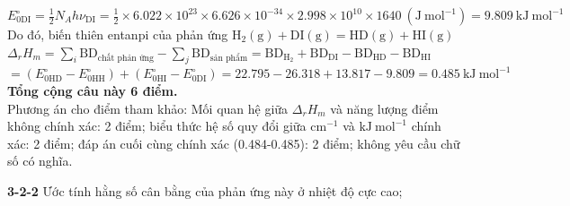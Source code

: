 {\begin{minipage}{\dimexpr\textwidth-2\fboxsep-2\fboxrule\relax}
$E_{0\mathrm{DI}}^\circ = \frac{1}{2}N_A h\nu_{\mathrm{DI}} = \frac{1}{2}\times 6.022\times 10^{23} \times 6.626\times 10^{-34} \times 2.998\times 10^{10} \times 1640\ (\mathrm{J\ mol^{-1}}) = 9.809\ \mathrm{kJ\ mol^{-1}}$ \\[0.1cm]
Do đó, biến thiên entanpi của phản ứng $\mathrm{H_2(g) + DI(g) = HD(g) + HI(g)}$ \\[0.1cm]
$\Delta_r H_m = \sum_i \mathrm{BD}_{\text{chất phản ứng}} - \sum_j \mathrm{BD}_{\text{sản phẩm}} = \mathrm{BD}_{\mathrm{H_2}} + \mathrm{BD}_{\mathrm{DI}} - \mathrm{BD}_{\mathrm{HD}} - \mathrm{BD}_{\mathrm{HI}}$ \\[0.1cm]
$= (E_{0\mathrm{HD}}^\circ - E_{0\mathrm{HH}}^\circ) + (E_{0\mathrm{HI}}^\circ - E_{0\mathrm{DI}}^\circ) = 22.795 - 26.318 + 13.817 - 9.809 = 0.485\ \mathrm{kJ\ mol^{-1}}$ \\[0.2cm]
\textbf{Tổng cộng câu này 6 điểm.} \\[0.1cm]
Phương án cho điểm tham khảo: Mối quan hệ giữa $\Delta_r H_m$ và năng lượng điểm không chính xác: 2 điểm; biểu thức hệ số quy đổi giữa $\mathrm{cm^{-1}}$ và $\mathrm{kJ\ mol^{-1}}$ chính xác: 2 điểm; đáp án cuối cùng chính xác (0.484-0.485): 2 điểm; không yêu cầu chữ số có nghĩa.
\vspace{0.1cm}
\end{minipage}
}

\vspace{0.2cm}

\noindent
\textbf{3-2-2} Ước tính hằng số cân bằng của phản ứng này ở nhiệt độ cực cao;


\noindent{}

